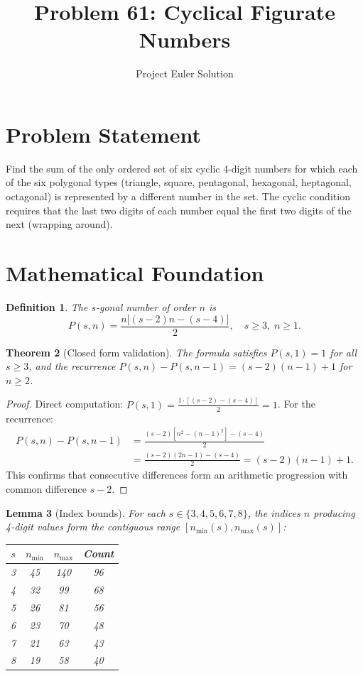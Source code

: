 \documentclass[12pt,a4paper]{article}
\title{Problem 61: Cyclical Figurate Numbers}
\author{Project Euler Solution}
\date{}
\newtheorem{theorem}{Theorem}
\newtheorem{lemma}[theorem]{Lemma}
\newtheorem{definition}[theorem]{Definition}
\begin{document}
\maketitle

\section{Problem Statement}

Find the sum of the only ordered set of six cyclic 4-digit numbers for which each of the six polygonal types (triangle, square, pentagonal, hexagonal, heptagonal, octagonal) is represented by a different number in the set. The cyclic condition requires that the last two digits of each number equal the first two digits of the next (wrapping around).

\section{Mathematical Foundation}

\begin{definition}
The \emph{$s$-gonal number} of order $n$ is
\[
P(s, n) = \frac{n\bigl[(s-2)n - (s-4)\bigr]}{2}, \quad s \ge 3, \; n \ge 1.
\]
\end{definition}

\begin{theorem}[Closed form validation]
The formula satisfies $P(s,1) = 1$ for all $s \ge 3$, and the recurrence $P(s,n) - P(s,n-1) = (s-2)(n-1) + 1$ for $n \ge 2$.
\end{theorem}

\begin{proof}
Direct computation: $P(s,1) = \frac{1 \cdot [(s-2) - (s-4)]}{2} = 1$. For the recurrence:
\begin{align*}
P(s,n) - P(s,n-1) &= \frac{(s-2)[n^2 - (n-1)^2] - (s-4)}{2} \\
&= \frac{(s-2)(2n-1) - (s-4)}{2} = (s-2)(n-1) + 1.
\end{align*}
This confirms that consecutive differences form an arithmetic progression with common difference $s-2$.
\end{proof}

\begin{lemma}[Index bounds]
For each $s \in \{3,4,5,6,7,8\}$, the indices $n$ producing 4-digit values form the contiguous range $[n_{\min}(s), n_{\max}(s)]$:
\begin{center}
\begin{tabular}{cccc}
$s$ & $n_{\min}$ & $n_{\max}$ & Count \\
\hline
3 & 45 & 140 & 96 \\
4 & 32 & 99 & 68 \\
5 & 26 & 81 & 56 \\
6 & 23 & 70 & 48 \\
7 & 21 & 63 & 43 \\
8 & 19 & 58 & 40 \\
\end{tabular}
\end{center}
\end{lemma}
\end{document}
